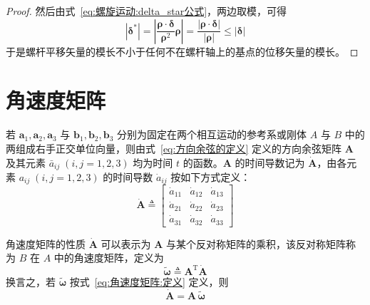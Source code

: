 \begin{proof}
然后由式~\eqref{eq:螺旋运动:delta_star公式}，两边取模，可得
\begin{equation}
    \left|\bm{\delta}^*\right| = \left|\frac{\bm{\rho} \cdot \bm{\delta}}{\bm{\rho}^2} \bm{\rho}\right|=\frac{\left|\bm{\rho} \cdot \bm{\delta}\right|}{\left|\bm{\rho}\right|}\leqslant \left|\bm{\delta}\right|
\end{equation}
于是螺杆平移矢量的模长不小于任何不在螺杆轴上的基点的位移矢量的模长。
\end{proof}

\section{角速度矩阵}\label{sec:角速度矩阵}
若 $\mathbf{a}_1,\mathbf{a}_2,\mathbf{a}_3$ 与 $\mathbf{b}_1,\mathbf{b}_2,\mathbf{b}_3$ 分别为固定在两个相互运动的参考系或刚体 $A$ 与 $B$ 中的两组成右手正交单位向量，则由式~\eqref{eq:方向余弦的定义} 定义的方向余弦矩阵 $\bm{A}$ 及其元素 $\bar{a}_{ij}\;(i,j=1,2,3)$ 均为时间 $t$ 的函数。$\bm{A}$ 的时间导数记为 $\dot{\bm{A}}$，由各元素 $a_{ij}\;(i,j=1,2,3)$ 的时间导数 $\dot{a}_{ij}$ 按如下方式定义：
\begin{equation}
    \dot{\bm{A}}\triangleq\begin{bmatrix}
        \dot{a}_{11}&\dot{a}_{12}&\dot{a}_{13}\\
        \dot{a}_{21}&\dot{a}_{22}&\dot{a}_{23}\\
        \dot{a}_{31}&\dot{a}_{32}&\dot{a}_{33}
    \end{bmatrix}
    \label{eq:角速度矩阵:微分定义}
\end{equation}
\begin{myTheorem}{角速度矩阵的性质}
$\dot{\bm{A}}$ 可以表示为 $\bm{A}$ 与某个反对称矩阵的乘积，该反对称矩阵称为 $B$ 在 $A$ 中的角速度矩阵，定义为
\begin{equation}
    \bm{\tilde{\omega}}\triangleq\bm{A}^{\mathrm{T}}\dot{\bm{A}}
    \label{eq:角速度矩阵:定义}
\end{equation}
换言之，若 $\bm{\tilde{\omega}}$ 按式~\eqref{eq:角速度矩阵:定义} 定义，则
\begin{equation}
    \dot{\bm{A}}=\bm{A}\,\bm{\tilde{\omega}}
    \label{eq:角速度矩阵:基本关系}
\end{equation}
\end{myTheorem}

